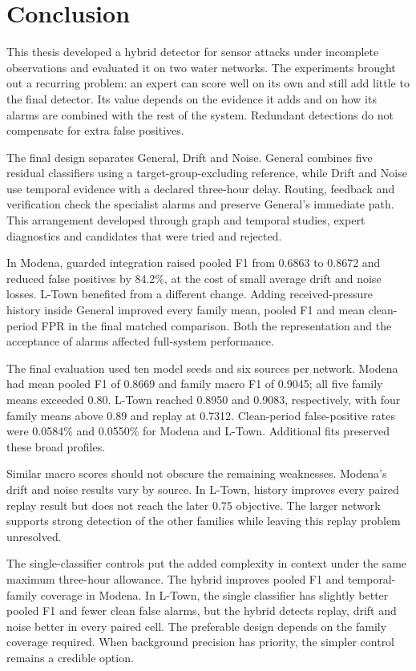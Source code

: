 \chapter{Conclusion}
\label{ch:conclusion}

This thesis developed a hybrid detector for sensor attacks under incomplete observations and evaluated it on two water networks. The experiments brought out a recurring problem: an expert can score well on its own and still add little to the final detector. Its value depends on the evidence it adds and on how its alarms are combined with the rest of the system. Redundant detections do not compensate for extra false positives.

The final design separates General, Drift and Noise. General combines five residual classifiers using a target-group-excluding reference, while Drift and Noise use temporal evidence with a declared three-hour delay. Routing, feedback and verification check the specialist alarms and preserve General's immediate path. This arrangement developed through graph and temporal studies, expert diagnostics and candidates that were tried and rejected.

In Modena, guarded integration raised pooled F1 from 0.6863 to 0.8672 and reduced false positives by 84.2\%, at the cost of small average drift and noise losses. L-Town benefited from a different change. Adding received-pressure history inside General improved every family mean, pooled F1 and mean clean-period FPR in the final matched comparison. Both the representation and the acceptance of alarms affected full-system performance.

The final evaluation used ten model seeds and six sources per network. Modena had mean pooled F1 of 0.8669 and family macro F1 of 0.9045; all five family means exceeded 0.80. L-Town reached 0.8950 and 0.9083, respectively, with four family means above 0.89 and replay at 0.7312. Clean-period false-positive rates were 0.0584\% and 0.0550\% for Modena and L-Town. Additional fits preserved these broad profiles.

Similar macro scores should not obscure the remaining weaknesses. Modena's drift and noise results vary by source. In L-Town, history improves every paired replay result but does not reach the later 0.75 objective. The larger network supports strong detection of the other families while leaving this replay problem unresolved.

The single-classifier controls put the added complexity in context under the same maximum three-hour allowance. The hybrid improves pooled F1 and temporal-family coverage in Modena. In L-Town, the single classifier has slightly better pooled F1 and fewer clean false alarms, but the hybrid detects replay, drift and noise better in every paired cell. The preferable design depends on the family coverage required. When background precision has priority, the simpler control remains a credible option.

